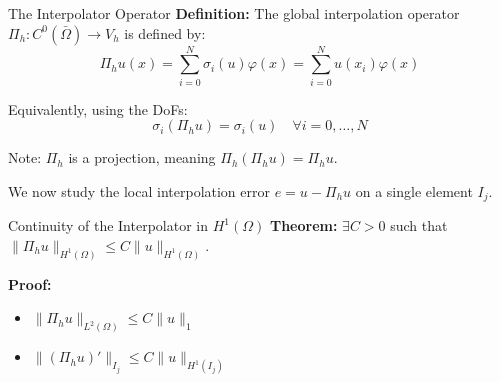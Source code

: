 \documentclass[aspectratio=169]{beamer}
\begin{document}
\begin{frame}{The Interpolator Operator}
    \textbf{Definition:} The global interpolation operator $\Pi_h : C^0(\bar{\Omega}) \to V_h$ is defined by:
    $$ \Pi_h u(x) = \sum_{i=0}^N \sigma_i (u) \varphi(x) = \sum_{i=0}^N u(x_i) \varphi(x) $$

    Equivalently, using the DoFs:
    $$ \sigma_i(\Pi_h u) = \sigma_i(u) \quad \forall i=0,\dots,N $$

    Note: $\Pi_h$ is a projection, meaning $\Pi_h(\Pi_h u) = \Pi_h u$.

    We now study the local interpolation error $e = u - \Pi_h u$ on a single element $I_j$.
\end{frame}
\begin{frame}[t]{Continuity of the Interpolator in $H^1(\Omega)$}
    \textbf{Theorem:} $\exists C > 0$ such that $\|\Pi_h u\|_{H^1(\Omega)} \leq C \|u\|_{H^1(\Omega)}$.
    
    \textbf{Proof:} 
        \begin{itemize}
            \item<1-> $\| \Pi_h u \|_{L^2(\Omega)} \leq C \| u\|_1$
                \item<2-> $ \| (\Pi_h u)' \|_{I_j} \leq C \|u \|_{H^1(I_j)} $ 
    

\end{itemize}
\end{frame}
\end{document}
